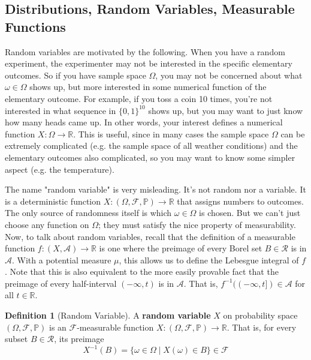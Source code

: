 \documentclass{article}
\theoremstyle{definition}
\theoremstyle{remark}
\theoremstyle{definition}
\newtheorem{definition}{Definition}[section]
\begin{document}
\subsection{Distributions, Random Variables, Measurable Functions}

Random variables are motivated by the following. When you have a random experiment, the experimenter may not be interested in the specific elementary outcomes. So if you have sample space $\Omega$, you may not be concerned about what $\omega \in \Omega$ shows up, but more interested in some numerical function of the elementary outcome. For example, if you toss a coin 10 times, you're not interested in what sequence in $\{0, 1\}^{10}$ shows up, but you may want to just know how many heads came up. In other words, your interest defines a numerical function $X: \Omega \rightarrow \mathbb{R}$. This is useful, since in many cases the sample space $\Omega$ can be extremely complicated (e.g. the sample space of all weather conditions) and the elementary outcomes also complicated, so you may want to know some simpler aspect (e.g. the temperature). 

The name "random variable" is very misleading. It's not random nor a variable. It is a deterministic function $X: (\Omega, \mathcal{F}, \mathbb{P}) \longrightarrow \mathbb{R}$ that assigns numbers to outcomes. The only source of randomness itself is which $\omega \in \Omega$ is chosen. But we can't just choose any function on $\Omega$; they must satisfy the nice property of measurability. Now, to talk about random variables, recall that the definition of a measurable function $f: (X, \mathcal{A}) \longrightarrow \mathbb{R}$ is one where the preimage of every Borel set $B \in \mathcal{R}$ is in $\mathcal{A}$. With a potential measure $\mu$, this allows us to define the Lebesgue integral of $f$. Note that this is also equivalent to the more easily provable fact that the preimage of every half-interval $(-\infty, t)$ is in $\mathcal{A}$. That is, $f^{-1}((-\infty, t]) \in \mathcal{A}$ for all $t \in \mathbb{R}$. 

\begin{definition}[Random Variable]
A \textbf{random variable} $X$ on probability space $(\Omega, \mathcal{F}, \mathbb{P})$ is an $\mathcal{F}$-measurable function $X: (\Omega, \mathcal{F}, \mathbb{P}) \longrightarrow \mathbb{R}$. That is, for every subset $B \in \mathcal{R}$, its preimage \[X^{-1} (B) = \{\omega \in \Omega \mid X(\omega) \in B\} \in \mathcal{F}\]
\end{definition}
\end{document}
